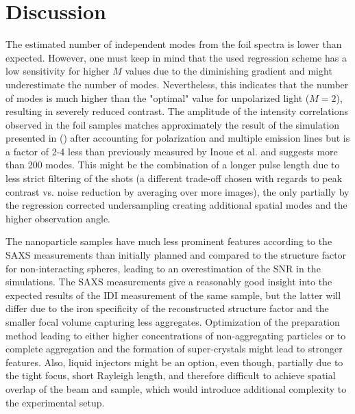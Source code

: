 \section{Discussion}

The estimated number of independent modes from the foil spectra is lower than expected. However, one must keep in mind that the used regression scheme has a low sensitivity for higher $M$ values due to the diminishing gradient and might underestimate the number of modes. Nevertheless, this indicates that the number of modes is much higher than the "optimal" value for unpolarized light ($M=2$), resulting in severely reduced contrast. The amplitude of the intensity correlations observed in the foil samples matches approximately the result of the simulation presented in   () after accounting for polarization and multiple emission lines but is a factor of 2-4 less than previously measured by Inoue et al. and suggests more than 200 modes. This might be the combination of a longer pulse length due to less strict filtering of the shots (a different trade-off chosen with regards to peak contrast vs. noise reduction by averaging over more images), the only partially by the regression corrected undersampling creating additional spatial modes and the higher observation angle.

The nanoparticle samples have much less prominent features according to the SAXS measurements than initially planned and compared to the structure factor for non-interacting spheres, leading to an overestimation of the SNR in the simulations. The SAXS measurements give a reasonably good insight into the expected results of the IDI measurement of the same sample, but the latter will differ due to the iron specificity of the reconstructed structure factor and the smaller focal volume capturing less aggregates. Optimization of the preparation method leading to either higher concentrations of non-aggregating particles or to complete aggregation and the formation of super-crystals might lead to stronger features. Also, liquid injectors might be an option, even though, partially due to the tight focus, short Rayleigh length, and therefore difficult to achieve spatial overlap of the beam and sample, which would introduce additional complexity to the experimental setup.

